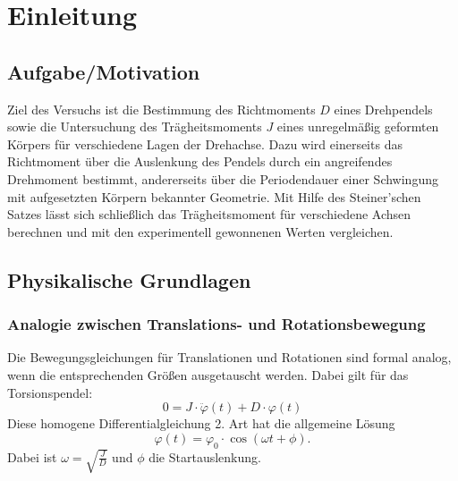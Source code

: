 \chapter{Einleitung}

\section{Aufgabe/Motivation}
Ziel des Versuchs ist die Bestimmung des Richtmoments $D$ eines Drehpendels sowie die Untersuchung des Trägheitsmoments $J$ eines unregelmäßig geformten Körpers für verschiedene Lagen der Drehachse. Dazu wird einerseits das Richtmoment über die Auslenkung des Pendels durch ein angreifendes Drehmoment bestimmt, andererseits über die Periodendauer einer Schwingung mit aufgesetzten Körpern bekannter Geometrie. Mit Hilfe des Steiner’schen Satzes lässt sich schließlich das Trägheitsmoment für verschiedene Achsen berechnen und mit den experimentell gewonnenen Werten vergleichen.

\section{Physikalische Grundlagen}
\cite{skript25}
\subsection*{Analogie zwischen Translations- und Rotationsbewegung}
Die Bewegungsgleichungen für Translationen und Rotationen sind formal analog, wenn die entsprechenden Größen ausgetauscht werden. Dabei gilt für das Torsionspendel:
\begin{equation}
    0 = J \cdot \ddot \varphi(t) + D \cdot \varphi(t)
\end{equation}
Diese homogene Differentialgleichung 2. Art hat die allgemeine Lösung
\begin{equation}
    \varphi(t) = \varphi_0 \cdot \cos(\omega t + \phi).
\end{equation}
Dabei ist $\omega = \sqrt{\frac{J}{D}}$ und $\phi$ die Startauslenkung.

